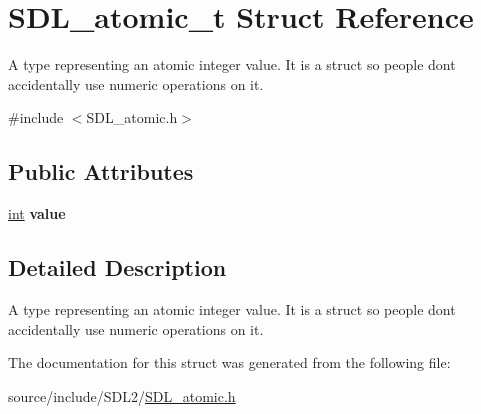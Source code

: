 \hypertarget{struct_s_d_l__atomic__t}{}\section{S\+D\+L\+\_\+atomic\+\_\+t Struct Reference}
\label{struct_s_d_l__atomic__t}


A type representing an atomic integer value. It is a struct so people don\textquotesingle{}t accidentally use numeric operations on it.  




{\ttfamily \#include $<$S\+D\+L\+\_\+atomic.\+h$>$}

\subsection*{Public Attributes}
\begin{DoxyCompactItemize}
\item 
\hypertarget{struct_s_d_l__atomic__t_a0d09ddf3cc5798c709edb7cea104203a}{}\hyperlink{_s_d_l__thread_8h_a6a64f9be4433e4de6e2f2f548cf3c08e}{int} {\bfseries value}\label{struct_s_d_l__atomic__t_a0d09ddf3cc5798c709edb7cea104203a}

\end{DoxyCompactItemize}


\subsection{Detailed Description}
A type representing an atomic integer value. It is a struct so people don\textquotesingle{}t accidentally use numeric operations on it. 

The documentation for this struct was generated from the following file\+:\begin{DoxyCompactItemize}
\item 
source/include/\+S\+D\+L2/\hyperlink{_s_d_l__atomic_8h}{S\+D\+L\+\_\+atomic.\+h}\end{DoxyCompactItemize}
